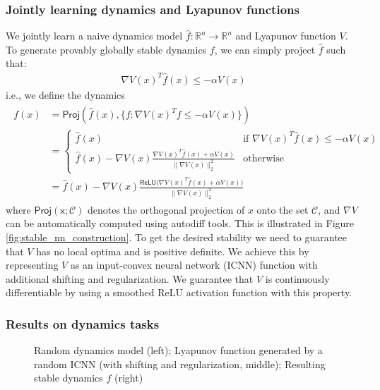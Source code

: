 \documentclass[11pt]{article}
\begin{document}
\subsubsection{Jointly learning dynamics and Lyapunov functions}
We jointly learn a naive dynamics model $\hat f: \mathbb{R}^n \to \mathbb{R}^n$ and Lyapunov function $V$. To generate provably globally stable dynamics $f$, we can simply project $\hat f$ such that:
\begin{align}
    \nabla V(x)^T \hat{f}(x) \leq -\alpha V(x)
\end{align}
i.e., we define the dynamics
\begin{align}
\label{eq:dynamics}
    \begin{split}
    f(x) & =  \mathsf{Proj}\left(\hat{f}(x), \{f: \nabla V(x)^T f \leq -\alpha V(x)\}\right ) \\
    & = \begin{cases} \hat{f}(x) & \mbox{if } \nabla V(x)^T \hat{f}(x) \leq -\alpha V(x) \\
    \hat{f}(x) - \nabla V(x)\frac{\nabla V(x)^T \hat{f}(x) + \alpha V (x)}{\|\nabla V(x)\|_2^2}    
         & \mbox{otherwise} \end{cases} \\
    & = \hat{f}(x) - \nabla V(x)\frac{\mathsf{ReLU}\bigl(\nabla V(x)^T \hat{f}(x) + \alpha V (x) \bigr)}{\|\nabla V(x)\|_2^2}    
 \end{split}
\end{align}
where $\mathsf{Proj(x;\mathcal{C})}$ denotes the orthogonal projection of $x$ onto the set $\mathcal{C}$, and $\nabla V$ can be automatically computed using autodiff tools. This is illustrated in Figure \ref{fig:stable_nn_construction}.
To get the desired stability we need to guarantee that $V$ has no local optima and is positive definite. We achieve this by representing $V$ as an input-convex neural network (ICNN) function \citep{amos2017input} with additional shifting and regularization. We guarantee that $V$ is continuously differentiable by using a smoothed ReLU activation function with this property.

\subsubsection{Results on dynamics tasks}

\begin{figure}[p]
  
  \caption{Random dynamics model (left); Lyapunov function generated by a random ICNN (with shifting and regularization, middle); Resulting stable dynamics $f$ (right)}
  \label{fig:nominal_dynamics}
\end{figure}
\end{document}
